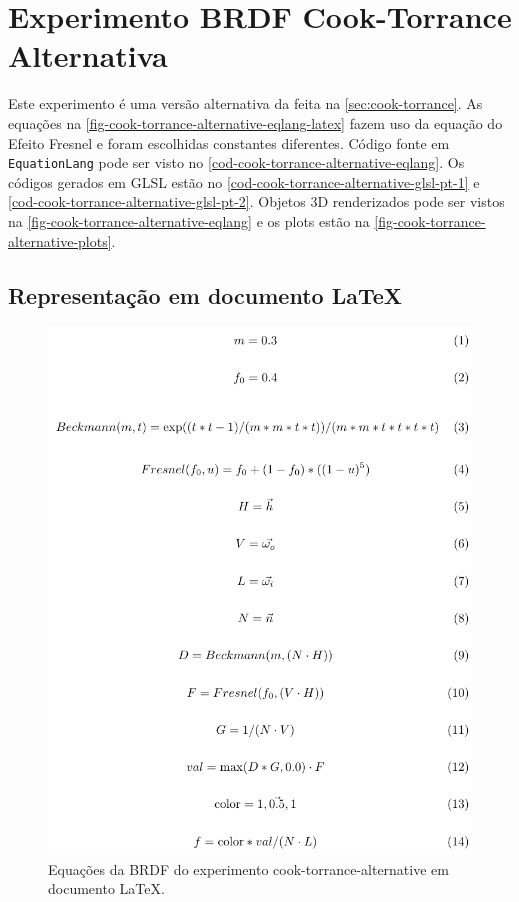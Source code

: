 \section{Experimento BRDF Cook-Torrance Alternativa}

Este experimento é uma versão alternativa da feita na \autoref{sec:cook-torrance}. As equações na \autoref{fig-cook-torrance-alternative-eqlang-latex} fazem uso da equação do Efeito Fresnel e foram escolhidas constantes diferentes. Código fonte em \texttt{EquationLang} pode ser visto no \autoref{cod-cook-torrance-alternative-eqlang}. Os códigos gerados em GLSL estão no \autoref{cod-cook-torrance-alternative-glsl-pt-1} e \autoref{cod-cook-torrance-alternative-glsl-pt-2}. Objetos 3D renderizados pode ser vistos na \autoref{fig-cook-torrance-alternative-eqlang} e os plots estão na \autoref{fig-cook-torrance-alternative-plots}.

\subsection{Representação em documento \LaTeX{}}
\begin{figure}[H]
    \caption{\label{fig-cook-torrance-alternative-eqlang-latex} \small Equações da BRDF do experimento cook-torrance-alternative em documento \LaTeX{}.}
    \begin{center}
        \includegraphics[scale=0.92]{./Imagens/brdfs/cook-torrance-alternative.pdf}
    \end{center}
\end{figure}

